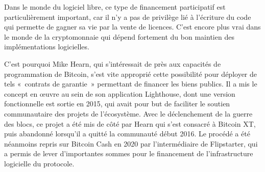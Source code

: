 Dans le monde du logiciel libre, ce type de financement participatif est particulièrement important, car il n'y a pas de privilège lié à l'écriture du code qui permette de gagner sa vie par la vente de licences. C'est encore plus vrai dans le monde de la cryptomonnaie qui dépend fortement du bon maintien des implémentations logicielles.

C'est pourquoi Mike Hearn, qui s'intéressait de près aux capacités de programmation de Bitcoin, s'est vite approprié cette possibilité pour déployer de tels «~contrats de garantie~» permettant de financer les biens publics. Il a mis le concept en œuvre au sein de son application Lighthouse, dont une version fonctionnelle est sortie en 2015, qui avait pour but de faciliter le soutien communautaire des projets de l'écosystème. Avec le déclenchement de la guerre des blocs, ce projet a été mis de côté par Hearn qui s'est consacré à Bitcoin XT, puis abandonné lorsqu'il a quitté la communauté début 2016. Le procédé a été néanmoins repris sur Bitcoin Cash en 2020 par l'intermédiaire de Flipstarter, qui a permis de lever d'importantes sommes pour le financement de l'infrastructure logicielle du protocole. %

